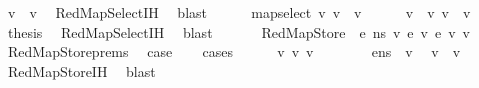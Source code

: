 \begin{isabellebody}
\ {\isachardoublequoteopen}v{}\ {\isacharequal}{\kern0pt}\ v{}{\isacharprime}{\kern0pt}{\isachardoublequoteclose}\ \isamarkupfalse%
\ RedMapSelect{\isachardot}{\kern0pt}IH\ \isamarkupfalse%
\ blast\isanewline
\ \ \ \ \isamarkupfalse%
\ {\isachardoublequoteopen}map{\isacharunderscore}{\kern0pt}select\ v{}{\isacharprime}{\kern0pt}\ v{}{\isacharprime}{\kern0pt}\ {\isacharequal}{\kern0pt}\ v{\isacharprime}{\kern0pt}{\isachardoublequoteclose}\isanewline
\ \ \ \ \isamarkupfalse%
\ {\isacartoucheopen}v{}\ {\isacharequal}{\kern0pt}\ v{}{\isacharprime}{\kern0pt}{\isacartoucheclose}\ {\isacartoucheopen}v{}\ {\isacharequal}{\kern0pt}\ v{}{\isacharprime}{\kern0pt}{\isacartoucheclose}\ \isamarkupfalse%
\ {\isacharquery}{\kern0pt}thesis\ \isamarkupfalse%
\ RedMapSelect{\isachardot}{\kern0pt}IH\ \isamarkupfalse%
\ blast\isanewline
\ \ \isamarkupfalse%
\isanewline
{}\isamarkupfalse%
\isanewline
\ \ \isamarkupfalse%
\ {\isacharparenleft}{\kern0pt}RedMapStore\ {\isasymOmega}\ e{}\ n{\isacharunderscore}{\kern0pt}s\ v{}\ e{}\ v{}\ e{}\ v{}\ v{\isacharparenright}{\kern0pt}\isanewline
\ \ \isamarkupfalse%
\ RedMapStore{\isachardot}{\kern0pt}prems\ \isamarkupfalse%
\ {\isacharquery}{\kern0pt}case\isanewline
\ \ \isamarkupfalse%
\ {\isacharparenleft}{\kern0pt}cases{\isacharparenright}{\kern0pt}\isanewline
\ \ \ \ \isamarkupfalse%
\ v{}{\isacharprime}{\kern0pt}\ v{}{\isacharprime}{\kern0pt}\ v{}{\isacharprime}{\kern0pt}\isanewline
\ \ \ \ \isamarkupfalse%
\ {\isachardoublequoteopen}{\isasymLambda}{\isacharcomma}{\kern0pt}{\isasymGamma}{\isacharcomma}{\kern0pt}{\isasymOmega}\ {\isasymturnstile}\ {\isasymlangle}e{}{\isacharcomma}{\kern0pt}n{\isacharunderscore}{\kern0pt}s{\isasymrangle}\ {\isasymDown}\ v{}{\isacharprime}{\kern0pt}{\isachardoublequoteclose}\ \isamarkupfalse%
\ {\isachardoublequoteopen}v{}\ {\isacharequal}{\kern0pt}\ v{}{\isacharprime}{\kern0pt}{\isachardoublequoteclose}\ \isamarkupfalse%
\ RedMapStore{\isachardot}{\kern0pt}IH\ \isamarkupfalse%
\ blast\isanewline

\end{isabellebody}
